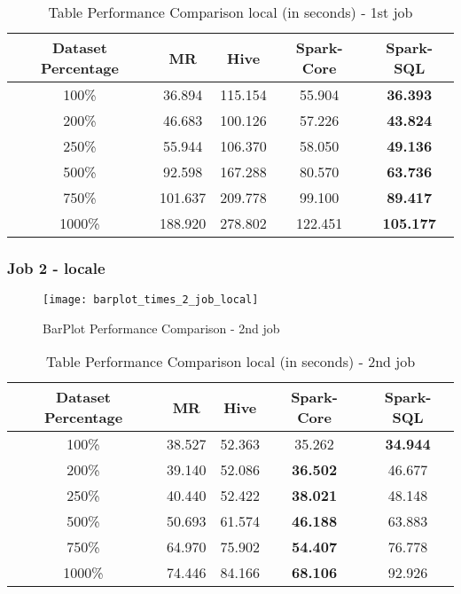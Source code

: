 \begin{table}[!ht]
  \centering
  \caption{Table Performance Comparison local (in seconds) - 1st job}
  \label{tab:performance}
  \begin{tabular}{c|c|c|c|c}
    \toprule
    Dataset Percentage & MR & Hive & Spark-Core & Spark-SQL \\
    \midrule
    100\% & 36.894 & 115.154 & 55.904 & \textbf{36.393} \\
    200\% & 46.683 & 100.126 & 57.226 & \textbf{43.824} \\
    250\% & 55.944 & 106.370 & 58.050 & \textbf{49.136} \\
    500\% & 92.598 & 167.288 & 80.570 & \textbf{63.736} \\
    750\% & 101.637 & 209.778 & 99.100 & \textbf{89.417} \\
    1000\% & 188.920 & 278.802 & 122.451 & \textbf{105.177} \\
    \bottomrule
  \end{tabular}
\end{table}
\newpage
\subsubsection{Job 2 - locale}
\begin{figure}[!ht]
    \centering
    \texttt{[image: barplot\_times\_2\_job\_local]}
    \caption{BarPlot Performance Comparison - 2nd job}
\end{figure}

\begin{table}[!ht]
  \centering
  \caption{Table Performance Comparison local (in seconds) - 2nd job}
  \label{tab:performance}
  \begin{tabular}{c|c|c|c|c}
    \toprule
    Dataset Percentage & MR & Hive & Spark-Core & Spark-SQL \\
    \midrule
    100\% & 38.527 & 52.363 & 35.262 & \textbf{34.944} \\
    200\% & 39.140 & 52.086 & \textbf{36.502} & 46.677 \\
    250\% & 40.440 & 52.422 & \textbf{38.021} & 48.148 \\
    500\% & 50.693 & 61.574 & \textbf{46.188} & 63.883 \\
    750\% & 64.970 & 75.902 & \textbf{54.407} & 76.778 \\
    1000\% & 74.446 & 84.166 & \textbf{68.106} & 92.926 \\
    \bottomrule
  \end{tabular}
\end{table}
\newpage

